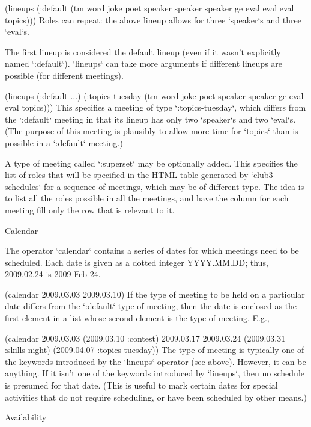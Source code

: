 \begintt
(lineups (:default
           (tm word joke poet speaker speaker speaker
               ge eval eval eval topics)))
\endtt
Roles can repeat: the above lineup allows for three `speaker`s and three
`eval`s.

The first lineup is considered the default lineup (even if it wasn’t
explicitly named `:default`).  `lineups` can take more arguments if different
lineups are possible (for different meetings).

\begintt
(lineups (:default ...)
         (:topics-tuesday
          (tm word joke poet speaker speaker ge eval eval topics)))
\endtt
This specifies a meeting of type `:topics-tuesday`, which differs from the
`:default` meeting in that its lineup has only two `speaker`s and two `eval`s.
(The purpose of this meeting is plausibly to allow more time for `topics`
than is possible in a `:default` meeting.)

A type of meeting called `:superset` may be optionally added.  This
specifies the list of roles that will be specified in the HTML table
generated by `club3 schedules` for a sequence of meetings, which may be
of different type.  The idea is to list all the roles possible in all
the meetings, and have the column for each meeting fill only the row
that is relevant to it.

\beginsection Calendar

The operator `calendar` contains a series of dates for which meetings need
to be scheduled.  Each date is given as a dotted integer YYYY.MM.DD; thus,
2009.02.24 is 2009 Feb 24.

\begintt
(calendar 2009.03.03
          2009.03.10)
\endtt
If the type of meeting to be held on a particular date differs from the
`:default` type of meeting, then the date is enclosed as the first element
in a list whose second element is the type of meeting. E.g.,

\begintt
(calendar 2009.03.03
          (2009.03.10 :contest)
          2009.03.17
          2009.03.24
          (2009.03.31 :skills-night)
          (2009.04.07 :topics-tuesday))
\endtt
The type of meeting is typically one of the keywords introduced by the
`lineups` operator (see above).  However, it can be anything.  If it isn’t one
of the keywords introduced by `lineups`, then no schedule is presumed
for that date.  (This is useful to mark certain dates for special
activities that do not require scheduling, or have been scheduled by
other means.)

\beginsection Availability

